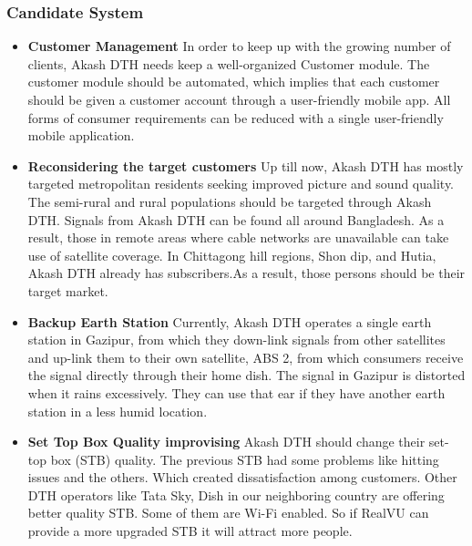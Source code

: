 \begin{spacing}{1}
\subsubsection{Candidate System}
\begin{itemize}
\item {\bf  Customer Management } \newline In order to keep up with the growing number of clients, Akash DTH needs keep a well-organized Customer module. The customer module should be automated, which implies that each customer should be given a customer account through a user-friendly mobile app. All forms of consumer requirements can be reduced with a single user-friendly mobile application.
\item {\bf  Reconsidering the target customers } \newline Up till now, Akash DTH has mostly targeted metropolitan residents seeking improved picture and sound quality. The semi-rural and rural populations should be targeted through Akash DTH. Signals from Akash DTH can be found all around Bangladesh. As a result, those in remote areas where cable networks are unavailable can take use of satellite coverage. In Chittagong hill regions, Shon dip, and Hutia, Akash DTH already has subscribers.As a result, those persons should be their target market.
\item {\bf Backup Earth Station } \newline Currently, Akash DTH operates a single earth station in Gazipur, from which they down-link signals from other satellites and up-link them to their own satellite, ABS 2, from which consumers receive the signal directly through their home dish. The signal in Gazipur is distorted when it rains excessively. They can use that ear if they have another earth station in a less humid location.

\item {\bf  Set Top Box Quality improvising} \newline Akash DTH should change their set-top box (STB) quality. The previous STB had some problems like hitting issues and the others. Which created dissatisfaction among customers. Other DTH operators like Tata Sky, Dish in our neighboring country are offering better quality STB. Some of them are Wi-Fi enabled. So if RealVU can provide a more upgraded STB it will attract more people.
\end{itemize}


\end{spacing}

